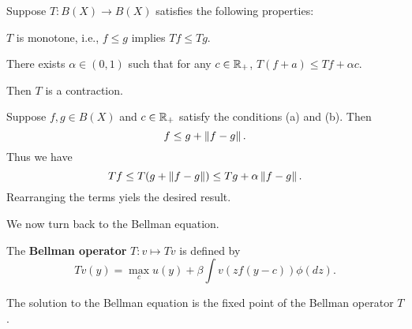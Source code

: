 \documentclass[12pt]{article}
\begin{document}
\begin{theorem}
    Suppose $T: B(X) \to B(X)$ satisfies the following properties: 
    \begin{thmenum}
        \item $T$ is monotone, i.e., $f \leq g$ implies $Tf \leq Tg$.
        \item There exists $\alpha\in (0,1)$ such that for any 
        $c\in \mathbb{R}_+$, $T(f+a) \leq Tf + \alpha c$.
    \end{thmenum}
    Then $T$ is a contraction.
\end{theorem}
\begin{pf}
    Suppose $f, g \in B(X)$ and $c\in\mathbb{R}_+$ satisfy the conditions 
    (a) and (b). Then 
    \begin{equation}
        f \leq g + \left\lVert {f-g} \right\rVert.
    \end{equation}
    Thus we have 
    \begin{equation}
        Tf \leq T(g + \left\lVert {f-g} \right\rVert) \leq Tg + \alpha\left\lVert {f-g} \right\rVert.
    \end{equation}
    Rearranging the terms yiels the desired result.
\end{pf}

We now turn back to the Bellman equation. 

\begin{definition}
    The \textbf{Bellman operator} $T: v \mapsto Tv$ is defined by 
    \begin{equation}
        Tv(y) = \max_{c} u(y) + \beta\int v(zf(y-c))\phi(dz).
    \end{equation}
\end{definition}
\begin{remark}
    The solution to the Bellman equation is the fixed point of the 
    Bellman operator $T$.
\end{remark}
\end{document}
